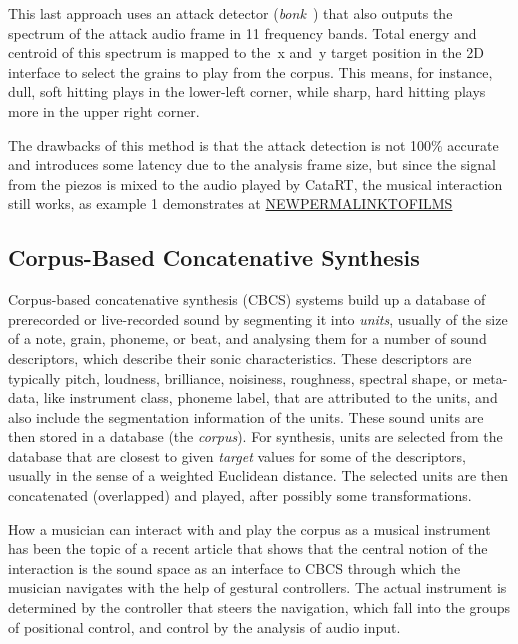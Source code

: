 This last approach uses an attack detector (\textit{bonk~}) that also outputs the spectrum of the
attack audio frame in 11 frequency bands.  Total energy and centroid of this spectrum is mapped to
the~x and~y target position in the 2D interface to select the grains to play from the corpus.
This means, for instance, dull, soft hitting plays in the lower-left corner, while sharp, hard hitting plays more in the upper right corner.

The drawbacks of this method is that the attack detection is not 100\% accurate and introduces some latency due to the analysis frame size, but since the signal from the piezos is mixed to the
audio played by CataRT, the musical interaction still works, as example 1 demonstrates at \url{NEWPERMALINKTOFILMS} %

\subsection{Corpus-Based Concatenative Synthesis}

Corpus-based concatenative synthesis (CBCS) \cite{Schwarz-ieeespm2007-concat} systems build up a database of prerecorded or live-recorded sound by segmenting it into
\textit{units}, usually of the size of a note, grain, phoneme, or beat, and analysing them for a
number of sound descriptors, which describe their sonic characteristics.
These descriptors are typically pitch, loudness, brilliance, noisiness, roughness, spectral shape, or meta-data, like instrument class, phoneme label, that are attributed to the units,
and also include the segmentation information of the units.
These sound units are then stored in a database (the \textit{corpus}).  For synthesis, units are
selected from the database that are closest to given \textit{target} values for some of the
descriptors, usually in the sense of a weighted Euclidean distance.
The selected units are then concatenated (overlapped) and played, after possibly some transformations.

How a musician can interact with and play the corpus as a musical instrument has been the topic of a recent article \cite{Schwarz-nime2012-sound-space} that shows that the central notion of the interaction is the sound space as an interface to CBCS through which the musician navigates with the help of gestural controllers.  
The actual instrument is determined by the controller that steers the
navigation, which fall into the groups of positional control, and control by the analysis of audio
input.

